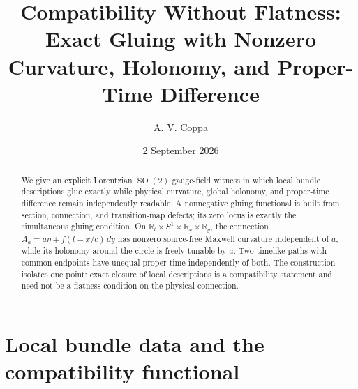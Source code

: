 \documentclass[aps,prd,reprint,nofootinbib,superscriptaddress]{revtex4-2}
\newcommand{\SO}{\operatorname{SO}}
\newcommand{\R}{\mathbb R}
\begin{document}
\title{Compatibility Without Flatness:\\Exact Gluing with Nonzero Curvature, Holonomy, and Proper-Time Difference}

\author{A. V. Coppa}
\date{2 September 2026}

\begin{abstract}
We give an explicit Lorentzian $\SO(2)$ gauge-field witness in which local bundle descriptions glue exactly while physical curvature, global holonomy, and proper-time difference remain independently readable. A nonnegative gluing functional is built from section, connection, and transition-map defects; its zero locus is exactly the simultaneous gluing condition. On $\R_t\times S^1\times\R_x\times\R_y$, the connection $A_a=a\eta+f(t-x/c)\,dy$ has nonzero source-free Maxwell curvature independent of $a$, while its holonomy around the circle is freely tunable by $a$. Two timelike paths with common endpoints have unequal proper time independently of both. The construction isolates one point: exact closure of local descriptions is a compatibility statement and need not be a flatness condition on the physical connection.
\end{abstract}

\maketitle

\section{Local bundle data and the compatibility functional}
\end{document}
